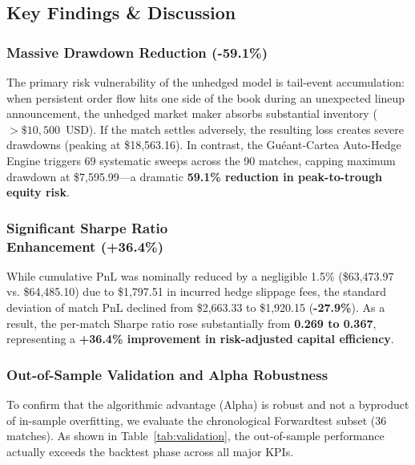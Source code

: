 \documentclass[10pt,twocolumn]{article}
\begin{document}
\subsection{Key Findings \& Discussion}

\subsubsection{Massive Drawdown Reduction (-59.1\%)}
The primary risk vulnerability of the unhedged model is tail-event accumulation: when persistent order flow hits one side of the book during an unexpected lineup announcement, the unhedged market maker absorbs substantial inventory ($>\$10,500$~USD). If the match settles adversely, the resulting loss creates severe drawdowns (peaking at \$18,563.16). In contrast, the Guéant-Cartea Auto-Hedge Engine triggers 69 systematic sweeps across the 90 matches, capping maximum drawdown at \$7,595.99---a dramatic \textbf{59.1\% reduction in peak-to-trough equity risk}.

\subsubsection[Significant Sharpe Ratio Enhancement (+36.4\%)]{Significant Sharpe Ratio \\ Enhancement (+36.4\%)}
While cumulative PnL was nominally reduced by a negligible 1.5\% (\$63,473.97 vs. \$64,485.10) due to \$1,797.51 in incurred hedge slippage fees, the standard deviation of match PnL declined from \$2,663.33 to \$1,920.15 (\textbf{-27.9\%}). As a result, the per-match Sharpe ratio rose substantially from \textbf{0.269 to 0.367}, representing a \textbf{+36.4\% improvement in risk-adjusted capital efficiency}.

\subsubsection{Out-of-Sample Validation and Alpha Robustness}
To confirm that the algorithmic advantage (Alpha) is robust and not a byproduct of in-sample overfitting, we evaluate the chronological Forwardtest subset (36 matches). As shown in Table~\ref{tab:validation}, the out-of-sample performance actually exceeds the backtest phase across all major KPIs. 
\end{document}
